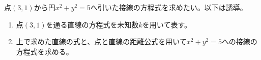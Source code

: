 \documentclass[12pt,a4paper]{jsarticle}
\begin{document}
$点(3,1)から円x^2+y^2=5$へ引いた接線の方程式を求めたい。以下は誘導。
\begin{enumerate}
    \item 点$(3,1)$を通る直線の方程式を未知数$k$を用いて表す。
    \item 上で求めた直線の式と、点と直線の距離公式を用いて$x^2+y^2=5$への接線の方程式を求める。
\end{enumerate}
\end{document}
